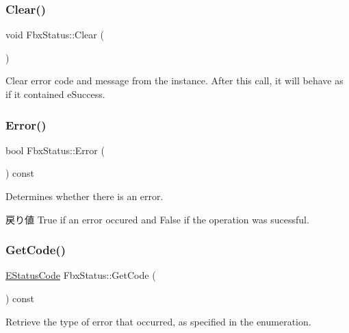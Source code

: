 \subsubsection{\texorpdfstring{Clear()}{Clear()}}
{\footnotesize\ttfamily void Fbx\+Status\+::\+Clear (\begin{DoxyParamCaption}{ }\end{DoxyParamCaption})}



Clear error code and message from the instance. After this call, it will behave as if it contained e\+Success. 

\mbox{\label{class_fbx_status_ab698013e2bdef14baef8842d0dfa00ea}} 
\subsubsection{\texorpdfstring{Error()}{Error()}}
{\footnotesize\ttfamily bool Fbx\+Status\+::\+Error (\begin{DoxyParamCaption}{ }\end{DoxyParamCaption}) const}

Determines whether there is an error. \begin{DoxyReturn}{戻り値}
{\ttfamily True} if an error occured and {\ttfamily False} if the operation was sucessful. 
\end{DoxyReturn}
\mbox{\label{class_fbx_status_a342ecfe81651d2c99785cac9592a41dc}} 
\subsubsection{\texorpdfstring{Get\+Code()}{GetCode()}}
{\footnotesize\ttfamily \hyperlink{class_fbx_status_a6a631d5d95b28e31a19aabd5f5809ecc}{E\+Status\+Code} Fbx\+Status\+::\+Get\+Code (\begin{DoxyParamCaption}{ }\end{DoxyParamCaption}) const}



Retrieve the type of error that occurred, as specified in the enumeration. 

\mbox{\label{class_fbx_status_aa36b462a6c63105538c483518415fb66}} 
